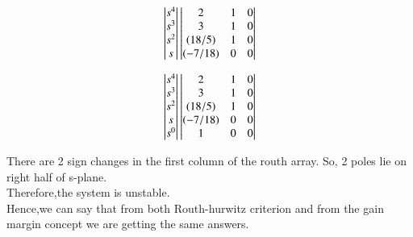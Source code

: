 \begin{enumerate}[label=\thesection.\arabic*.,ref=\thesection.\theenumi]
\begin{align}
\begin{vmatrix}s^4\\s^3\\s^2\\s\end{vmatrix}
\begin{vmatrix}2 & 1 & 0 \\ 3 & 1 & 0 \\ (18/5) & 1 & 0 \\ (-7/18) & 0 & 0\end{vmatrix}
\end{align}

\begin{align}
\begin{vmatrix}s^4\\s^3\\s^2\\s\\s^0\end{vmatrix}
\begin{vmatrix}2 & 1 & 0 \\ 3 & 1 & 0 \\ (18/5) & 1 & 0 \\ (-7/18) & 0 & 0 \\ 1 & 0 & 0\end{vmatrix}
\end{align}

There are 2 sign changes in the first column of the routh array. So, 2 poles lie on right half of s-plane. 
\\
Therefore,the system is unstable.\\

Hence,we can say that from both Routh-hurwitz criterion and from the gain margin concept we are getting the same answers.
\end{enumerate}


